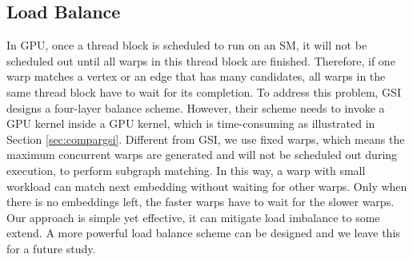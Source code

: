 \subsection{Load Balance}
In GPU, once a thread block is scheduled to run on an SM, it will not be scheduled out until all warps in this thread block are finished. Therefore, if one warp matches a vertex or an edge that has many candidates, all warps in the same thread block have to wait for its completion. To address this problem, GSI designs a four-layer balance scheme. However, their scheme needs to invoke a GPU kernel inside a GPU kernel, which is time-consuming as illustrated in Section \ref{sec:compargsi}. Different from GSI, we use fixed warps, which means the maximum concurrent warps are generated and will not be scheduled out during execution, to perform subgraph matching. In this way, a warp with small workload can match next embedding without waiting for other warps. Only when there is no embeddings left, the faster warps have to wait for the slower warps. Our approach is simple yet effective, it can mitigate load imbalance to some extend. A more powerful load balance scheme can be designed and we leave this for a future study.